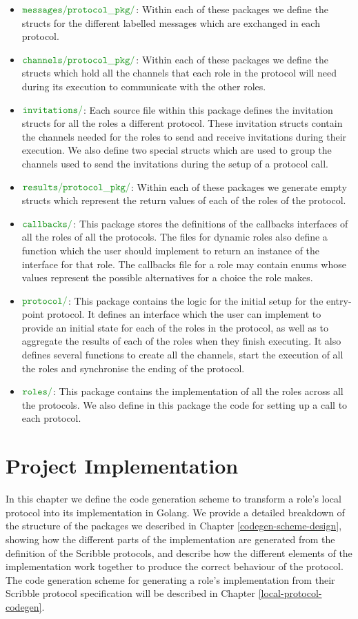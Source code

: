 \documentclass[12pt,twoside]{report}
\begin{document}
\begin{itemize}
    \item $\dirname{messages}\dirname{protocol\_pkg}$: Within each of these packages we define the structs for the different labelled messages which are exchanged in each protocol.
    \item  $\dirname{channels}\dirname{protocol\_pkg}$: Within each of these packages we define the structs which hold all the channels that each role in the protocol will need during its execution to communicate with the other roles.
    \item $\dirname{invitations}$: Each source file within this package defines the invitation structs for all the roles a different protocol. These invitation structs contain the channels needed for the roles to send and receive invitations during their execution. We also define two special structs which are used to group the channels used to send the invitations during the setup of a protocol call. 
    \item $\dirname{results}\dirname{protocol\_pkg}$: Within each of these packages we generate empty structs which represent the return values of each of the roles of the protocol.
    \item $\dirname{callbacks}$: This package stores the definitions of the callbacks interfaces of all the roles of all the protocols. The files for dynamic roles also define a function which the user should implement to return an instance of the interface for that role. The callbacks file for a role may contain enums whose values represent the possible alternatives for a choice the role makes.
    \item $\dirname{protocol}$: This package contains the logic for the initial setup for the entry-point protocol. It defines an interface which the user can implement to provide an initial state for each of the roles in the protocol, as well as to aggregate the results of each of the roles when they finish executing. It also defines several functions to create all the channels, start the execution of all the roles and synchronise the ending of the protocol.
    \item $\dirname{roles}$: This package contains the implementation of all the roles across all the protocols. We also define in this package the code for setting up a call to each protocol.
\end{itemize}

\chapter{Project Implementation}\label{go-codegen}
In this chapter we define the code generation scheme to transform a role's local protocol into its implementation in Golang. We provide a detailed breakdown of the structure of the packages we described in Chapter \ref{codegen-scheme-design}, showing how the different parts of the implementation are generated from the definition of the Scribble protocols, and describe how the different elements of the implementation work together to produce the correct behaviour of the protocol. The code generation scheme for generating a role's implementation from their Scribble protocol specification will be described in Chapter \ref{local-protocol-codegen}.
\end{document}
